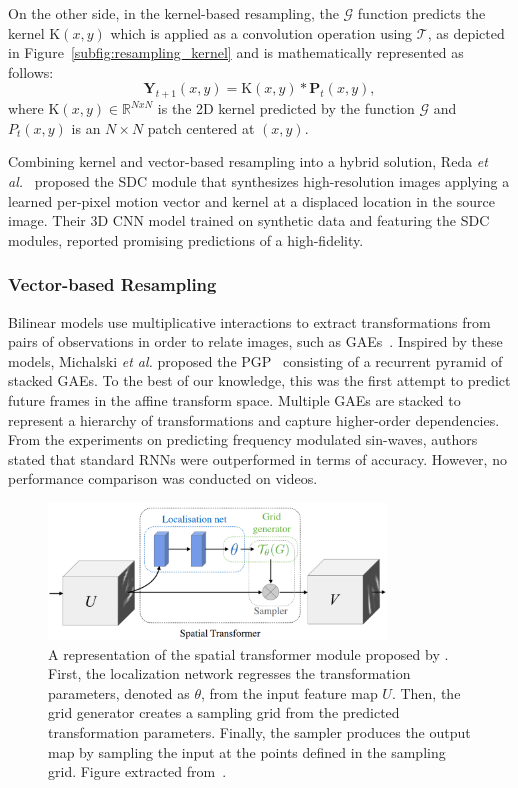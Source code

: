 On the other side, in the kernel-based resampling, the $\mathcal{G}$ function predicts the kernel $\mathrm{K}(x, y)$ which is applied as a convolution operation using $\mathcal{T}$, as depicted in Figure~\ref{subfig:resampling_kernel} and is mathematically represented as follows:
\begin{equation}
\mathbf{Y}_{t+1}(x, y)=\mathrm{K}(x, y) * \mathbf{P}_{t}(x, y),
\end{equation} 
where $\mathrm{K}(x, y)\in\mathbb{R}^{NxN}$ is the 2D kernel predicted by the function $\mathcal{G}$ and $P_t(x,y)$ is an $N \times N$ patch centered at $(x,y)$. %

Combining kernel and vector-based resampling into a hybrid solution, Reda \textit{et al.}~\cite{Reda2018} proposed the \ac{SDC} module that synthesizes high-resolution images applying a learned per-pixel motion vector and kernel at a displaced location in the source image. Their 3D \ac{CNN} model trained on synthetic data and featuring the \ac{SDC} modules, reported promising predictions of a high-fidelity.

\subsubsection{Vector-based Resampling}
Bilinear models use multiplicative interactions to extract transformations from pairs of observations in order to relate images, such as \acp{GAE}~\cite{Memisevic2013a}. Inspired by these models, Michalski \textit{et al.} proposed the \ac{PGP}~\cite{Michalski2014} consisting of a recurrent pyramid of stacked \acp{GAE}. To the best of our knowledge, this was the first attempt to predict future frames in the affine transform space. Multiple \acp{GAE} are stacked to represent a hierarchy of transformations and capture higher-order dependencies. From the experiments on predicting frequency modulated sin-waves, authors stated that standard \acp{RNN} were outperformed in terms of accuracy. However, no performance comparison was conducted on videos. 
\begin{figure}[tbp]
	\centering
	\includegraphics[width=0.8\textwidth]{figures/videoprediction/methods/spatial_transformer.png}
	\caption{A representation of the spatial transformer module proposed by \cite{Jaderberg2015}. First, the localization network regresses the transformation parameters, denoted as $\theta$, from the input feature map $U$. Then, the grid generator creates a sampling grid from the predicted transformation parameters. Finally, the sampler produces the output map by sampling the input at the points defined in the sampling grid. Figure extracted from~\cite{Jaderberg2015}.}
	\label{fig:spatial_transformer}
\end{figure}

